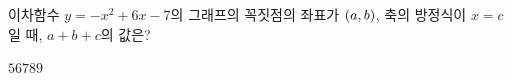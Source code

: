 \hspace*{2mm}\begin{minipage}[t]{\dimexpr\linewidth-2mm\relax}\vspace{0pt}
이차함수 $y=-x^2+6x-7$의 그래프의 꼭짓점의 좌표가 $(a{,}\mkern3mu b)$, 축의 방정식이 $x=c$일 때, $a+b+c$의 값은?
\begin{choices32}{$5$}{$6$}{$7$}{$8$}{$9$}\end{choices32}\end{minipage}

